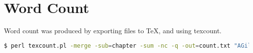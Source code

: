 
\section*{Word Count}

Word count was produced by exporting \LyX{} files to \TeX{}, and using
texcount.

%
\begin{lstlisting}[basicstyle={\ttfamily},breaklines=true,language=bash]
$ perl texcount.pl -merge -sub=chapter -sum -nc -q -out=count.txt "AGillman Thesis.tex"
\end{lstlisting}


%

